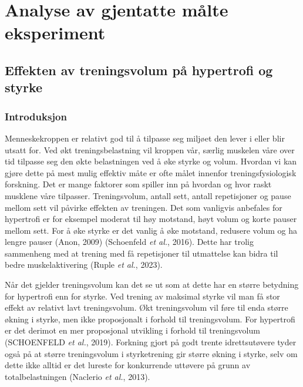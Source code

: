 \documentclass[
  letterpaper,
  DIV=11,
  numbers=noendperiod]{scrreprt}
\begin{document}

\chapter{Analyse av gjentatte målte
eksperiment}\label{analyse-av-gjentatte-muxe5lte-eksperiment}

\section{Effekten av treningsvolum på hypertrofi og
styrke}\label{effekten-av-treningsvolum-puxe5-hypertrofi-og-styrke}

\subsection{Introduksjon}\label{introduksjon-5}

Menneskekroppen er relativt god til å tilpasse seg miljøet den lever i
eller blir utsatt for. Ved økt treningsbelastning vil kroppen vår,
særlig muskelen våre over tid tilpasse seg den økte belastningen ved å
øke styrke og volum. Hvordan vi kan gjøre dette på mest mulig effektiv
måte er ofte målet innenfor treningsfysiologisk forskning. Det er mange
faktorer som spiller inn på hvordan og hvor raskt musklene våre
tilpasser. Treningsvolum, antall sett, antall repetisjoner og pause
mellom sett vil påvirke effekten av treningen. Det som vanligvis
anbefales for hypertrofi er for eksempel moderat til høy motstand, høyt
volum og korte pauser mellom sett. For å øke styrke er det vanlig å øke
motstand, redusere volum og ha lengre pauser (Anon, 2009) (Schoenfeld
\emph{et al.}, 2016). Dette har trolig sammenheng med at trening med få
repetisjoner til utmattelse kan bidra til bedre muskelaktivering (Ruple
\emph{et al.}, 2023).

Når det gjelder treningsvolum kan det se ut som at dette har en større
betydning for hypertrofi enn for styrke. Ved trening av maksimal styrke
vil man få stor effekt av relativt lavt treningsvolum. Økt treningsvolum
vil føre til enda større økning i styrke, men ikke proposjonalt i
forhold til treningsvolum. For hypertrofi er det derimot en mer
proposjonal utvikling i forhold til treningsvolum (SCHOENFELD \emph{et
al.}, 2019). Forkning gjort på godt trente idrettsutøvere tyder også på
at større treningsvolum i styrketrening gir større økning i styrke, selv
om dette ikke alltid er det lureste for konkurrende uttøvere på grunn av
totalbelastningen (Naclerio \emph{et al.}, 2013).
\end{document}
